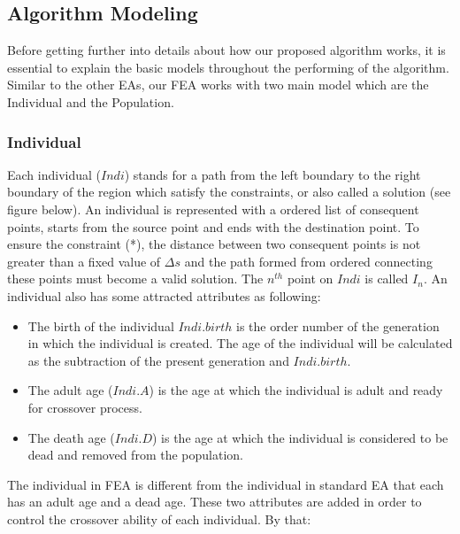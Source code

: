 \documentclass[final]{elsarticle}
\begin{document}
\subsection{Algorithm Modeling}

Before getting further into details about how our proposed algorithm works, it is essential to explain the basic models throughout the performing of the algorithm. Similar to the other EAs, our FEA works with two main model which are the Individual and the Population.

\subsubsection{Individual}

Each individual ($Indi$) stands for a path from the left boundary to the right boundary of the region which satisfy the constraints, or also called a solution (see figure below). An individual is represented with a ordered list of consequent points, starts from the source point and ends with the destination point. To ensure the constraint (*), the distance between two consequent points is not greater than a fixed value of $\Delta s$ and the path formed from ordered connecting these points must become a valid solution. The $n^{th}$ point on $Indi$ is called $I_n$. An individual also has some attracted attributes as following:
\begin{itemize}
	\item The birth of the individual $Indi.birth$ is the order number of the generation in which the individual is created. The age of the individual will be calculated as the subtraction of the present generation and $Indi.birth$.
	\item The adult age ($Indi.A$) is the age at which the individual is adult and ready for crossover process.
	\item The death age ($Indi.D$) is the age at which the individual is considered to be dead and removed from the population. 
\end{itemize}
The individual in FEA is different from the individual in standard EA that each has an adult age and a dead age. These two attributes are added in order to control the crossover ability of each individual. By that: 
\end{document}
